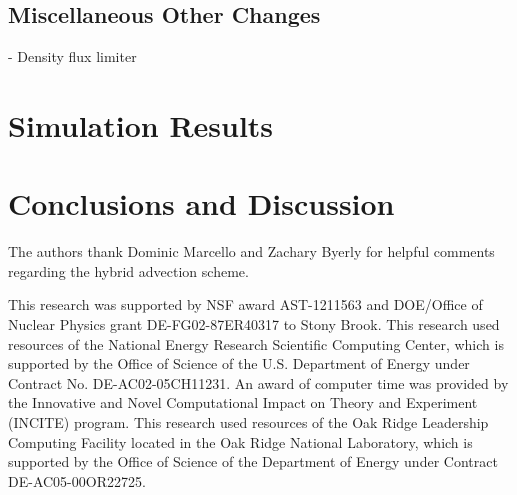 \documentclass[twocolumn,numberedappendix]{../aastex6}
\begin{document}
\subsection{Miscellaneous Other Changes}
\label{sec:hydro-other-changes}

- Density flux limiter



\section{Simulation Results}\label{sec:results}



\section{Conclusions and Discussion}\label{sec:Conclusions and Discussion}


\acknowledgments

The authors thank Dominic Marcello and Zachary Byerly for helpful comments
regarding the hybrid advection scheme.

This research was supported by NSF award AST-1211563 and DOE/Office of
Nuclear Physics grant DE-FG02-87ER40317 to Stony Brook.  This
research used resources of the National Energy Research Scientific
Computing Center, which is supported by the Office of Science of the
U.S. Department of Energy under Contract No. DE-AC02-05CH11231.  An
award of computer time was provided by the Innovative and Novel
Computational Impact on Theory and Experiment (INCITE) program.  This
research used resources of the Oak Ridge Leadership Computing Facility
located in the Oak Ridge National Laboratory, which is supported by
the Office of Science of the Department of Energy under Contract
DE-AC05-00OR22725.

\clearpage





\clearpage
\appendix
\end{document}
